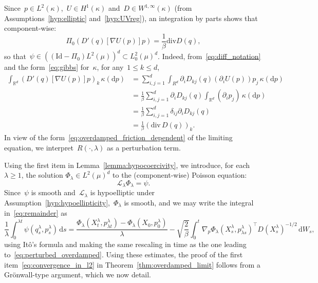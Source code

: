 \documentclass[10pt]{article}
\newcommand{\cL}{\mathcal{L}}
\renewcommand{\d}{\mathrm{d}}
\renewcommand{\div}{\mathrm{div}}
\newcommand{\R}{\mathbb{R}}
\newcommand{\wLmu}{L^2(\mu)}
\newcommand{\wLmuz}{L^2_0(\mu)}
\newcommand{\1}{\mathbbm 1}
\newcommand{\Id}{\mathrm{Id}}
\begin{document}
Since~$p\in L^2(\kappa)$,~$U\in H^1(\kappa)$ and~$D\in W^{1,\infty}(\kappa)$ (from Assumptions~\ref{hyp:elliptic} and~\ref{hyp:UVreg}), an integration by parts shows that component-wise:
\begin{equation}
    \Pi_0 \left(D'(q)\left[\nabla U(p)\right] p \right) = \frac1\beta\mathrm{div}D(q),
\end{equation}
so that~$\psi \in \left((\Id-\Pi_0)\wLmu\right)^d \subset \wLmuz^d$. Indeed, from~\eqref{eq:diff_notation} and the form~\eqref{eq:gibbs} for~$\kappa$, for any~${1\leq k\leq d}$,
\begin{equation}
    \label{eq:ipp_fonda}
    \begin{aligned}
    \int_{\R^d}\left(D'(q)\left[\nabla U(p)\right] p \right)_k\,\kappa(\d p) &= \sum_{i,j=1}^d \int_{R^d}\partial_{i}D_{kj}(q)(\partial_i U(p))p_j\,\kappa(\d p)\\
    &=\frac{1}{\beta}\sum_{i,j=1}^d\partial_i D_{kj}(q)\int_{\R^d}(\partial_i p_j)\,\kappa(\d p)\\
    &=\frac{1}{\beta}\sum_{i,j=1}^d \delta_{ij}\partial_i D_{kj}(q)\\
    &=\frac{1}{\beta}\left(\div\,D(q)\right)_k.
    \end{aligned}
\end{equation}
In view of the form~\eqref{eq:overdamped_friction_dependent} of the limiting equation, we interpret~$R(\cdot,\lambda)$ as a perturbation term.

Using the first item in Lemma~\ref{lemma:hypocoercivity}, we introduce, for each~$\lambda\geq 1$, the solution $\Phi_\lambda\in \wLmu^d$ to the (component-wise) Poisson equation:
\begin{equation}
    \label{eq:poisson_equation}
    \cL_\lambda\Phi_{\lambda} = \psi.
\end{equation}
Since~$\psi$ is smooth and~$\cL_\lambda$ is hypoelliptic under Assumption~\eqref{hyp:hypoellipticity},~$\Phi_\lambda$ is smooth, and we may write the integral in~\eqref{eq:remainder} as 
\begin{equation}
    \label{eq:remainder_integral}
    \frac1\lambda\int_0^{\lambda t} \psi(q_s^\lambda,p_{ s}^\lambda)\,\d s = \frac{\Phi_\lambda(X_t^\lambda,p_{\lambda t}^\lambda) - \Phi_\lambda(X_0,p_0^\lambda)}{\lambda} - \sqrt{\frac{2}{\beta}}\int_0^t \nabla_p \Phi_{\lambda}(X_s^\lambda,p_{\lambda s}^\lambda)^\top D(X_s^\lambda)^{-1/2}\,\d W_s,
\end{equation}
using It\^o's formula and making the same rescaling in time as the one leading to~\eqref{eq:perturbed_overdamped}.
Using these estimates, the proof of the first item~\eqref{eq:convergence_in_l2} in Theorem~\ref{thm:overdamped_limit} follows from a Gr\"onwall-type argument, which we now detail.
\end{document}
